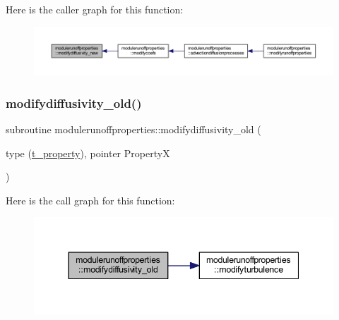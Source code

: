 Here is the caller graph for this function\+:\nopagebreak
\begin{figure}[H]
\begin{center}
\leavevmode
\includegraphics[width=350pt]{namespacemodulerunoffproperties_abb384a4ec2ef0d9cc812459889ee8063_icgraph}
\end{center}
\end{figure}
\mbox{\label{namespacemodulerunoffproperties_ae867bca73f793abb9a8fe22800ea546c}} 
\subsubsection{\texorpdfstring{modifydiffusivity\+\_\+old()}{modifydiffusivity\_old()}}
{\footnotesize\ttfamily subroutine modulerunoffproperties\+::modifydiffusivity\+\_\+old (\begin{DoxyParamCaption}\item[{type (\mbox{\hyperlink{structmodulerunoffproperties_1_1t__property}{t\+\_\+property}}), pointer}]{PropertyX }\end{DoxyParamCaption})\hspace{0.3cm}{\ttfamily [private]}}

Here is the call graph for this function\+:\nopagebreak
\begin{figure}[H]
\begin{center}
\leavevmode
\includegraphics[width=344pt]{namespacemodulerunoffproperties_ae867bca73f793abb9a8fe22800ea546c_cgraph}
\end{center}
\end{figure}
\mbox{\label{namespacemodulerunoffproperties_a2c08e63707bcb52fb1de5d2a76a15433}} 
